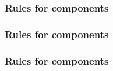 \begin{sbmlenum}
\end{sbmlenum} \subsubsection*{Rules for  components} \begin{sbmlenum}


\end{sbmlenum} \subsubsection*{Rules for  components} \begin{sbmlenum}


\end{sbmlenum} \subsubsection*{Rules for  components} \begin{sbmlenum}


\end{sbmlenum}
